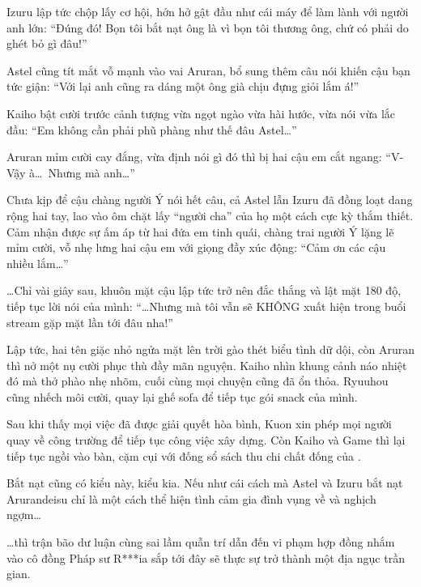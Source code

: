 \documentclass[../main.tex]{subfiles}
\begin{document}
Izuru lập tức chộp lấy cơ hội, hớn hở gật đầu như cái máy để làm lành với người anh lớn: ``Đúng đó! Bọn tôi bắt nạt ông là vì bọn tôi thương ông, chứ có phải do ghét bỏ gì đâu!''

Astel cũng tít mắt vỗ mạnh vào vai Aruran, bổ sung thêm câu nói khiến cậu bạn tức giận: ``Với lại anh cũng ra dáng một ông già chịu đựng giỏi lắm á!''

Kaiho bật cười trước cảnh tượng vừa ngọt ngào vừa hài hước, vừa nói vừa lắc đầu: ``Em không cần phải phũ phàng như thế đâu Astel\dots''

Aruran mỉm cười cay đắng, vừa định nói gì đó thì bị hai cậu em cắt ngang: ``V-Vậy à\dots\ Nhưng mà anh\dots''

Chưa kịp để cậu chàng người Ý nói hết câu, cả Astel lẫn Izuru đã đồng loạt dang rộng hai tay, lao vào ôm chặt lấy ``người cha'' của họ một cách cực kỳ thắm thiết. Cảm nhận được sự ấm áp từ hai đứa em tinh quái, chàng trai người Ý lặng lẽ mỉm cười, vỗ nhẹ lưng hai cậu em với giọng đầy xúc động: ``Cảm ơn các cậu nhiều lắm\dots''

\dots Chỉ vài giây sau, khuôn mặt cậu lập tức trở nên đắc thắng và lật mặt 180 độ, tiếp tục lời nói của mình: ``\dots Nhưng mà tôi vẫn sẽ KHÔNG xuất hiện trong buổi stream gặp mặt lần tới đâu nha!''

Lập tức, hai tên giặc nhỏ ngửa mặt lên trời gào thét biểu tình dữ dội, còn Aruran thì nở một nụ cười phục thù đầy mãn nguyện. Kaiho nhìn khung cảnh náo nhiệt đó mà thở phào nhẹ nhõm, cuối cùng mọi chuyện cũng đã ổn thỏa. Ryuuhou cũng nhếch môi cười, quay lại ghế sofa để tiếp tục gói snack của mình.

Sau khi thấy mọi việc đã được giải quyết hòa bình, Kuon xin phép mọi người quay về công trường để tiếp tục công việc xây dựng. Còn Kaiho và Game thì lại tiếp tục ngồi vào bàn, cặm cụi với đống sổ sách thu chi chất đống của \hls.

Bắt nạt cũng có kiểu này, kiểu kia. Nếu như cái cách mà Astel và Izuru bắt nạt Arurandeisu chỉ là một cách thể hiện tình cảm gia đình vụng về và nghịch ngợm\dots

\dots thì trận bão dư luận cùng sai lầm quẫn trí dẫn đến vi phạm hợp đồng nhắm vào cô đồng Pháp sư R***ia sắp tới đây sẽ thực sự trở thành một địa ngục trần gian.
\end{document}
